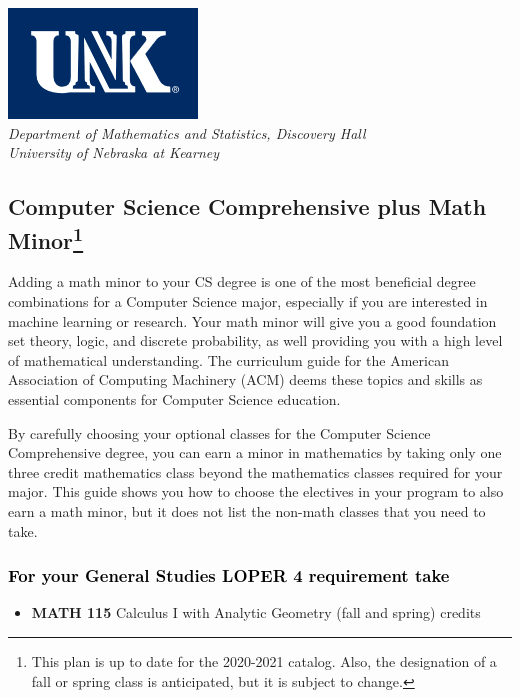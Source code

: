 \documentclass[10pt]{article}
\newcommand{\calcone}{\textbf{MATH 115} Calculus I with Analytic Geometry (fall and spring) \dotfill 5 credits}
\begin{document}
\begin{flushleft}
\includegraphics[scale=0.25]{unk-logo}\\
 \emph{\textcolor{unkblue}{Department of Mathematics and Statistics, Discovery Hall}} \\
  \emph{\textcolor{unkblue}{University of Nebraska at Kearney}}
\end{flushleft}


\subsection*{\textbf{\textcolor{unkblue}{Computer Science Comprehensive plus Math Minor\footnote[1]{This plan is up to date for the 2020-2021 catalog. Also, the designation of a fall or spring class is anticipated, but it is subject to change.
}}}}


Adding a math minor to your CS degree is one of the most beneficial degree combinations for a Computer Science major, especially if you are interested in machine learning or research.  Your math minor will give you a good foundation set theory, logic, and discrete probability, as well providing you with a high level of mathematical understanding.
The curriculum guide for the American Association of Computing Machinery (ACM) deems  these topics and skills  as essential components for  Computer Science education.

 By carefully choosing your optional classes for the Computer Science Comprehensive degree, you can earn a minor in mathematics by taking only one three credit mathematics class beyond the mathematics classes required for your major.  This guide shows you how to choose the electives in your program to also earn a math minor, but it does not list the non-math classes that you need to take.

\subsubsection*{\textcolor{black}{For  your General Studies LOPER 4 requirement take}}
\begin{itemize}
\item  \calcone
\end{itemize}
\end{document}
